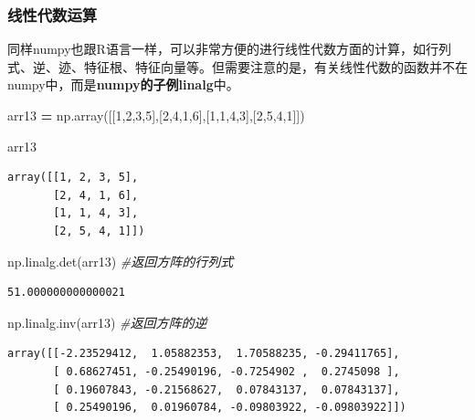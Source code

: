 \documentclass[]{article}
\newenvironment{Shaded}{\begin{snugshade}}{\end{snugshade}}
\newcommand{\DecValTok}[1]{\textcolor[rgb]{0.00,0.00,0.81}{#1}}
\newcommand{\CommentTok}[1]{\textcolor[rgb]{0.56,0.35,0.01}{\textit{#1}}}
\newcommand{\OperatorTok}[1]{\textcolor[rgb]{0.81,0.36,0.00}{\textbf{#1}}}
\newcommand{\NormalTok}[1]{#1}
\begin{document}
\subsubsection{线性代数运算}

同样numpy也跟R语言一样，可以非常方便的进行线性代数方面的计算，如行列式、逆、迹、特征根、特征向量等。但需要注意的是，有关线性代数的函数并不在numpy中，而是\textbf{numpy的子例linalg}中。

\begin{Shaded}
\begin{Highlighting}[]
\NormalTok{arr13 }\OperatorTok{=}\NormalTok{ np.array([[}\DecValTok{1}\NormalTok{,}\DecValTok{2}\NormalTok{,}\DecValTok{3}\NormalTok{,}\DecValTok{5}\NormalTok{],[}\DecValTok{2}\NormalTok{,}\DecValTok{4}\NormalTok{,}\DecValTok{1}\NormalTok{,}\DecValTok{6}\NormalTok{],[}\DecValTok{1}\NormalTok{,}\DecValTok{1}\NormalTok{,}\DecValTok{4}\NormalTok{,}\DecValTok{3}\NormalTok{],[}\DecValTok{2}\NormalTok{,}\DecValTok{5}\NormalTok{,}\DecValTok{4}\NormalTok{,}\DecValTok{1}\NormalTok{]])}
\end{Highlighting}
\end{Shaded}

\begin{Shaded}
\begin{Highlighting}[]
\NormalTok{arr13}
\end{Highlighting}
\end{Shaded}

\begin{verbatim}
array([[1, 2, 3, 5],
       [2, 4, 1, 6],
       [1, 1, 4, 3],
       [2, 5, 4, 1]])
\end{verbatim}

\begin{Shaded}
\begin{Highlighting}[]
\NormalTok{np.linalg.det(arr13) }\CommentTok{#返回方阵的行列式}
\end{Highlighting}
\end{Shaded}

\begin{verbatim}
51.000000000000021
\end{verbatim}

\begin{Shaded}
\begin{Highlighting}[]
\NormalTok{np.linalg.inv(arr13) }\CommentTok{#返回方阵的逆}
\end{Highlighting}
\end{Shaded}

\begin{verbatim}
array([[-2.23529412,  1.05882353,  1.70588235, -0.29411765],
       [ 0.68627451, -0.25490196, -0.7254902 ,  0.2745098 ],
       [ 0.19607843, -0.21568627,  0.07843137,  0.07843137],
       [ 0.25490196,  0.01960784, -0.09803922, -0.09803922]])
\end{verbatim}
\end{document}
